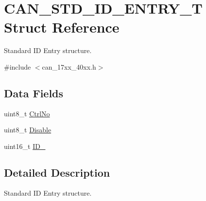 \hypertarget{structCAN__STD__ID__ENTRY__T}{\section{C\-A\-N\-\_\-\-S\-T\-D\-\_\-\-I\-D\-\_\-\-E\-N\-T\-R\-Y\-\_\-\-T Struct Reference}
\label{structCAN__STD__ID__ENTRY__T}
}


Standard I\-D Entry structure.  




{\ttfamily \#include $<$can\-\_\-17xx\-\_\-40xx.\-h$>$}

\subsection*{Data Fields}
\begin{DoxyCompactItemize}
\item 
uint8\-\_\-t \hyperlink{structCAN__STD__ID__ENTRY__T_a5361d52d7fcdc1a8598550836b91bb97}{Ctrl\-No}
\item 
uint8\-\_\-t \hyperlink{structCAN__STD__ID__ENTRY__T_a02dc64b0ae7683331953979d1ed9dce7}{Disable}
\item 
uint16\-\_\-t \hyperlink{structCAN__STD__ID__ENTRY__T_a7cb55fad6132fbd461a568ff724f9ca1}{I\-D\-\_}
\end{DoxyCompactItemize}


\subsection{Detailed Description}
Standard I\-D Entry structure. 

